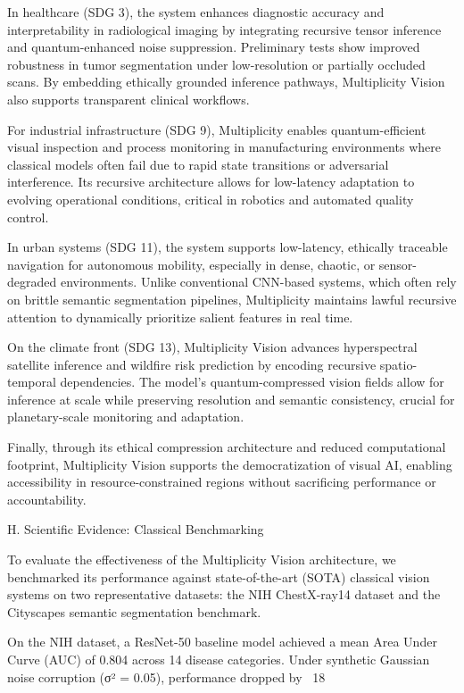 \documentclass[12pt]{article}
\theoremstyle{plain}
\begin{document}
In healthcare (SDG 3), the system enhances diagnostic accuracy and interpretability in radiological imaging by integrating recursive tensor inference and quantum-enhanced noise suppression. Preliminary tests show improved robustness in tumor segmentation under low-resolution or partially occluded scans. By embedding ethically grounded inference pathways, Multiplicity Vision also supports transparent clinical workflows.

For industrial infrastructure (SDG 9), Multiplicity enables quantum-efficient visual inspection and process monitoring in manufacturing environments where classical models often fail due to rapid state transitions or adversarial interference. Its recursive architecture allows for low-latency adaptation to evolving operational conditions, critical in robotics and automated quality control.

In urban systems (SDG 11), the system supports low-latency, ethically traceable navigation for autonomous mobility, especially in dense, chaotic, or sensor-degraded environments. Unlike conventional CNN-based systems, which often rely on brittle semantic segmentation pipelines, Multiplicity maintains lawful recursive attention to dynamically prioritize salient features in real time.

On the climate front (SDG 13), Multiplicity Vision advances hyperspectral satellite inference and wildfire risk prediction by encoding recursive spatio-temporal dependencies. The model’s quantum-compressed vision fields allow for inference at scale while preserving resolution and semantic consistency, crucial for planetary-scale monitoring and adaptation.

Finally, through its ethical compression architecture and reduced computational footprint, Multiplicity Vision supports the democratization of visual AI, enabling accessibility in resource-constrained regions without sacrificing performance 
or accountability.

H. Scientific Evidence: Classical Benchmarking

To evaluate the effectiveness of the Multiplicity Vision architecture, we benchmarked its performance against state-of-the-art (SOTA) classical vision systems on two representative datasets: the NIH ChestX-ray14 dataset and the Cityscapes semantic segmentation benchmark.

On the NIH dataset, a ResNet-50 baseline model achieved a mean Area Under Curve (AUC) of 0.804 across 14 disease categories. Under synthetic Gaussian noise corruption (σ² = 0.05), performance dropped by ~18%
\end{document}
